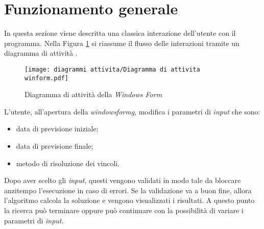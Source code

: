 \section{Funzionamento generale}
\noindent In questa sezione viene descritta una classica interazione dell'utente con il programma.
Nella Figura \ref{diagramma-attivita-Windows form} si riassume il flusso delle interazioni tramite un diagramma di attività \cite{siteH:rcardin}.

\begin{figure}[!h] 
    \centering 
    \texttt{[image: diagrammi attivita/Diagramma di attivita winform.pdf]} 
    \caption{Diagramma di attività della \textit{Windows Form}}
    \label{diagramma-attivita-Windows form}
\end{figure}

\noindent L'utente, all'apertura della \textit{\gls{windowsformg}}, modifica i parametri di \textit{input} che sono:
\begin{itemize}
    \item data di previsione iniziale;
    \item data di previsione finale;
    \item metodo di risoluzione dei vincoli.
\end{itemize}
\noindent Dopo aver scelto gli \textit{input}, questi vengono validati in modo tale da bloccare anzitempo
l'esecuzione in caso di errori.
Se la validazione va a buon fine, allora l'algoritmo calcola la soluzione e vengono visualizzati i risultati.
A questo punto la ricerca può terminare oppure può continuare con la possibilità di variare i parametri di \textit{input}.


